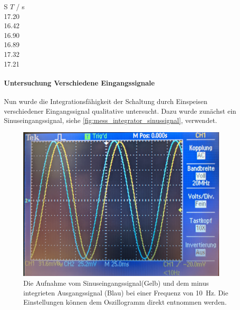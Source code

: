 \documentclass[12pt,english,ngerman]{scrartcl}
\begin{document}
\begin{table}
  \caption{Messungen der Integrationszeit der realen Integratorschaltung aus
  \autoref{fig:sim_integrator_schaltung}, wobei $T$ die Ladezeit bis am Ausgang
  \SI{10}{\volt} anliegt. Bei einem Ladespannung \SI{91.8}{\milli\volt}, einem
  Widerstand von \SI{21.9}{\kilo\ohm} und einer Kapazität von
  \SI{6.8}{\micro\farad} }
  \label{tab:messungen_integration}
  \centering
  \begin{tabular}[c]{S}
    {$T$ / \si{\second}} \\
    17.20 \\
    16.42 \\
    16.90 \\
    16.89 \\
    17.32 \\
    17.21 \\
  \end{tabular}
\end{table}


\paragraph{Untersuchung Verschiedene Eingangssignale}
Nun wurde die Integrationsfähigkeit der Schaltung durch Einspeisen
verschiedener Eingangssignal qualitative untersucht. Dazu wurde zunächst ein
Sinuseingangssignal, siehe \autoref{fig:mess_integrator_sinussignal}, verwendet.
 
\begin{figure}[H]
  \centering
    \includegraphics[width=0.95\textwidth]{./figures/integrator/sinussignal.jpg}
  \caption{Die Aufnahme vom Sinuseingangssignal(Gelb) und dem minus integrieten
  Ausgangssignal (Blau) bei einer Frequenz von \SI{10}{\hertz}. Die
  Einstellungen können dem Oszillogramm direkt entnommen werden.}
  \label{fig:mess_integrator_sinussignal}
\end{figure}
\end{document}

